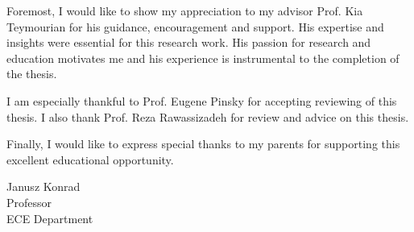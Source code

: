 Foremost, I would like to show my appreciation to my advisor Prof. Kia Teymourian for his guidance, encouragement and support.
His expertise and insights were essential for this research work. His passion for research and education motivates me and his experience is instrumental to the completion of the thesis.

I am especially thankful to Prof. Eugene Pinsky for accepting reviewing of this thesis. 
I also thank Prof. Reza Rawassizadeh for review and advice on this thesis.

Finally, I would like to express special thanks to my parents for supporting this excellent educational opportunity. 

\vskip 1in

\noindent
Janusz Konrad\\
Professor\\
ECE Department